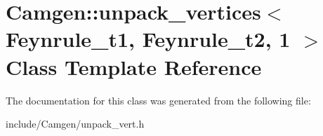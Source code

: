 \hypertarget{a00574}{}\section{Camgen\+:\+:unpack\+\_\+vertices$<$ Feynrule\+\_\+t1, Feynrule\+\_\+t2, 1 $>$ Class Template Reference}
\label{a00574}


The documentation for this class was generated from the following file\+:\begin{DoxyCompactItemize}
\item 
include/\+Camgen/unpack\+\_\+vert.\+h\end{DoxyCompactItemize}
